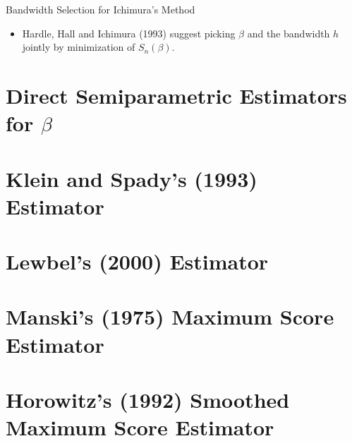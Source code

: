 \documentclass[xcolor=svgnames,dvipdfmx,cjk]{beamer}
\theoremstyle{example}
\begin{document}
  
  \begin{frame}{Bandwidth Selection for Ichimura's Method}
    \begin{itemize}
      \item Hardle, Hall and Ichimura (1993) suggest 
            picking $\beta$ and the bandwidth $h$ jointly
            by minimization of $S_n(\beta)$.
    \end{itemize}
  \end{frame}
  
  
  
  \section{Direct Semiparametric Estimators for $\beta$}
  
  
  
  
  
  
  
  
  
  
  
  
  
  
  
  
  
  
  
  \section{Klein and Spady's (1993) Estimator}
  
  
  
  
  
  
  
  
  
  \section{Lewbel's (2000) Estimator}
  
  
  
  
  
  
  
  
  
  
  \section{Manski's (1975) Maximum Score Estimator}
  
  
  
  
  
  
  
  
  
  \section{Horowitz's (1992) Smoothed Maximum Score Estimator}
  
\end{document}
